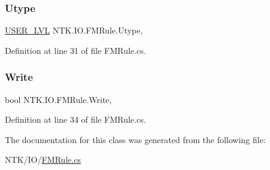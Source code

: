 \subsubsection{\texorpdfstring{Utype}{Utype}}
{\footnotesize\ttfamily \mbox{\hyperlink{namespace_n_t_k_a1a2136a0cde3a719c9188a4d515e9f1b}{U\+S\+E\+R\+\_\+\+L\+VL}} N\+T\+K.\+I\+O.\+F\+M\+Rule.\+Utype\hspace{0.3cm}{\ttfamily [get]}, {\ttfamily [set]}}



Definition at line 31 of file F\+M\+Rule.\+cs.

\mbox{\label{class_n_t_k_1_1_i_o_1_1_f_m_rule_a8f2b681b7442c2d5f42553f40d4cf3c4}} 
\subsubsection{\texorpdfstring{Write}{Write}}
{\footnotesize\ttfamily bool N\+T\+K.\+I\+O.\+F\+M\+Rule.\+Write\hspace{0.3cm}{\ttfamily [get]}, {\ttfamily [set]}}



Definition at line 34 of file F\+M\+Rule.\+cs.



The documentation for this class was generated from the following file\+:\begin{DoxyCompactItemize}
\item 
N\+T\+K/\+I\+O/\mbox{\hyperlink{_f_m_rule_8cs}{F\+M\+Rule.\+cs}}\end{DoxyCompactItemize}
